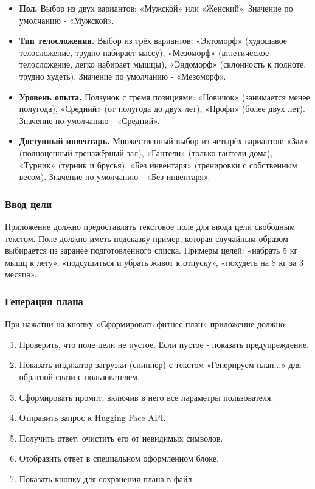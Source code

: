 \documentclass[14pt, a4paper]{extarticle}
\begin{document}
\begin{enumerate}
\begin{itemize}
\item \textbf{Пол.} Выбор из двух вариантов: «Мужской» или «Женский». Значение по умолчанию - «Мужской».

\item \textbf{Тип телосложения.} Выбор из трёх вариантов: «Эктоморф» (худощавое телосложение, трудно набирает массу), «Мезоморф» (атлетическое телосложение, легко набирает мышцы), «Эндоморф» (склонность к полноте, трудно худеть). Значение по умолчанию - «Мезоморф».

\item \textbf{Уровень опыта.} Ползунок с тремя позициями: «Новичок» (занимается менее полугода), «Средний» (от полугода до двух лет), «Профи» (более двух лет). Значение по умолчанию - «Средний».

\item \textbf{Доступный инвентарь.} Множественный выбор из четырёх вариантов: «Зал» (полноценный тренажёрный зал), «Гантели» (только гантели дома), «Турник» (турник и брусья), «Без инвентаря» (тренировки с собственным весом). Значение по умолчанию - «Без инвентаря».
\end{itemize}

\subsubsection{Ввод цели}

\noindent Приложение должно предоставлять текстовое поле для ввода цели свободным текстом. Поле должно иметь подсказку-пример, которая случайным образом выбирается из заранее подготовленного списка. Примеры целей: «набрать 5 кг мышц к лету», «подсушиться и убрать живот к отпуску», «похудеть на 8 кг за 3 месяца».

\subsubsection{Генерация плана}

\noindent При нажатии на кнопку «Сформировать фитнес-план» приложение должно:
\begin{enumerate}
\item Проверить, что поле цели не пустое. Если пустое - показать предупреждение.
\item Показать индикатор загрузки (спиннер) с текстом «Генерируем план...» для обратной связи с пользователем.
\item Сформировать промпт, включив в него все параметры пользователя.
\item Отправить запрос к Hugging Face API.
\item Получить ответ, очистить его от невидимых символов.
\item Отобразить ответ в специальном оформленном блоке.
\item Показать кнопку для сохранения плана в файл.
\end{enumerate}


\end{enumerate}
\end{document}
